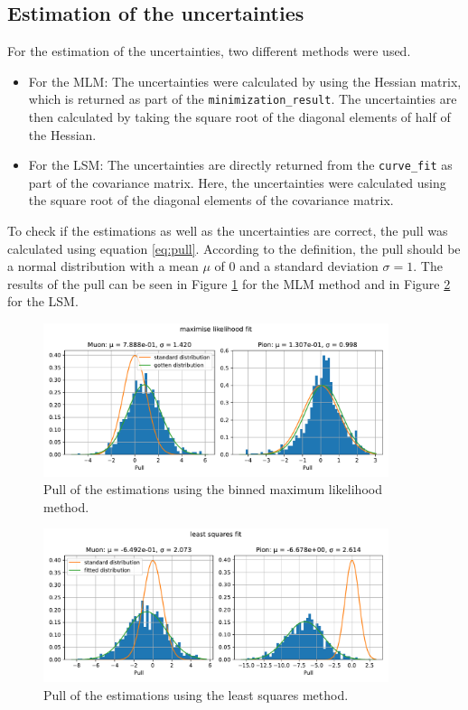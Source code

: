 \documentclass[11pt, a4paper, oneside]{book}
\newcommand\DoublePlotwidth{0.9}
\begin{document}
\FloatBarrier
\subsection{Estimation of the uncertainties}
For the estimation of the uncertainties, two different methods were used. 
\begin{itemize}
    \item For the MLM: The uncertainties were calculated by using the Hessian matrix, which is returned as part of the \lstinline{minimization_result}. The uncertainties are then calculated by taking the square root of the diagonal elements of half of the Hessian.
    \item For the LSM: The uncertainties are directly returned from the \lstinline{curve_fit} as part of the covariance matrix. Here, the uncertainties were calculated using the square root of the diagonal elements of the covariance matrix.
\end{itemize}

To check if the estimations as well as the uncertainties are correct, the pull was calculated using equation \ref{eq:pull}. According to the definition, the pull should be a normal distribution with a mean $\mu$ of 0 and a standard deviation $\sigma = 1$. The results of the pull can be seen in Figure \ref{fig:pull_likelihood_method} for the MLM method and in Figure \ref{fig:pull_least_squares_method} for the LSM. 

\begin{figure}[H]
  \centering
  \includegraphics[width=\DoublePlotwidth\textwidth]{images/estimators_pull_likelihood.pdf}
  \caption{Pull of the estimations using the binned maximum likelihood method.}
  \label{fig:pull_likelihood_method}
\end{figure}

\begin{figure}[H]
  \centering
  \includegraphics[width=\DoublePlotwidth\textwidth]{images/estimators_pull_least_squares.pdf}
  \caption{Pull of the estimations using the least squares method.}
  \label{fig:pull_least_squares_method}
\end{figure}
\end{document}
